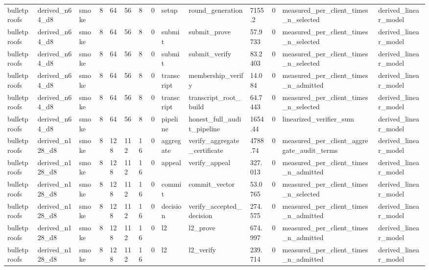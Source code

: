 \begin{table}[t]
\begin{tabular}{llllllllllllll}
bulletproofs & derived\_n64\_d8 & smoke & 8 & 64 & 56 & 8 & 0 & setup & round\_generation & 7155.2 & 0 & measured\_per\_client\_times\_n\_selected & derived\_linear\_model \\
bulletproofs & derived\_n64\_d8 & smoke & 8 & 64 & 56 & 8 & 0 & submit & submit\_prove & 57.9733 & 0 & measured\_per\_client\_times\_n\_selected & derived\_linear\_model \\
bulletproofs & derived\_n64\_d8 & smoke & 8 & 64 & 56 & 8 & 0 & submit & submit\_verify & 83.2403 & 0 & measured\_per\_client\_times\_n\_selected & derived\_linear\_model \\
bulletproofs & derived\_n64\_d8 & smoke & 8 & 64 & 56 & 8 & 0 & transcript & membership\_verify & 14.084 & 0 & measured\_per\_client\_times\_n\_admitted & derived\_linear\_model \\
bulletproofs & derived\_n64\_d8 & smoke & 8 & 64 & 56 & 8 & 0 & transcript & transcript\_root\_build & 64.7443 & 0 & measured\_per\_client\_times\_n\_selected & derived\_linear\_model \\
bulletproofs & derived\_n64\_d8 & smoke & 8 & 64 & 56 & 8 & 0 & pipeline & honest\_full\_audit\_pipeline & 1654.44 & 0 & linearized\_verifier\_sum & derived\_linear\_model \\
bulletproofs & derived\_n128\_d8 & smoke & 8 & 128 & 112 & 16 & 0 & aggregate & verify\_aggregate\_certificate & 4788.74 & 0 & measured\_per\_client\_aggregate\_audit\_terms & derived\_linear\_model \\
bulletproofs & derived\_n128\_d8 & smoke & 8 & 128 & 112 & 16 & 0 & appeal & verify\_appeal & 327.013 & 0 & measured\_per\_client\_times\_n\_admitted & derived\_linear\_model \\
bulletproofs & derived\_n128\_d8 & smoke & 8 & 128 & 112 & 16 & 0 & commit & commit\_vector & 53.0765 & 0 & measured\_per\_client\_times\_n\_selected & derived\_linear\_model \\
bulletproofs & derived\_n128\_d8 & smoke & 8 & 128 & 112 & 16 & 0 & decision & verify\_accepted\_decision & 274.575 & 0 & measured\_per\_client\_times\_n\_admitted & derived\_linear\_model \\
bulletproofs & derived\_n128\_d8 & smoke & 8 & 128 & 112 & 16 & 0 & l2 & l2\_prove & 674.997 & 0 & measured\_per\_client\_times\_n\_admitted & derived\_linear\_model \\
bulletproofs & derived\_n128\_d8 & smoke & 8 & 128 & 112 & 16 & 0 & l2 & l2\_verify & 239.714 & 0 & measured\_per\_client\_times\_n\_admitted & derived\_linear\_model \\

\end{tabular}
\end{table}

